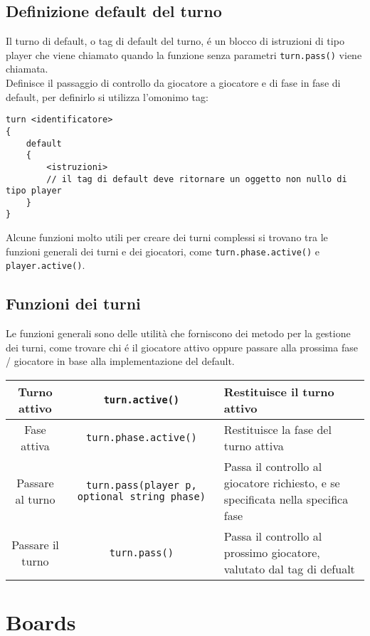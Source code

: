 \subsection{Definizione default del turno}
Il turno di default, o tag di default del turno, é un blocco di istruzioni di tipo player
che viene chiamato quando la funzione senza parametri \lstinline|turn.pass()| viene chiamata. \\
Definisce il passaggio di controllo da giocatore a giocatore e di fase in fase di default,
per definirlo si utilizza l'omonimo tag:
\begin{lstlisting}
turn <identificatore>
{
    default
    {
        <istruzioni>
        // il tag di default deve ritornare un oggetto non nullo di tipo player
    }
}
\end{lstlisting}
Alcune funzioni molto utili per creare dei turni complessi si trovano tra le 
funzioni generali dei turni e dei giocatori, come \lstinline|turn.phase.active()| e
\lstinline|player.active()|.

\subsection{Funzioni dei turni}
Le funzioni generali sono delle utilità che forniscono dei metodo per la gestione
dei turni, come trovare chi é il giocatore attivo oppure passare alla prossima 
fase / giocatore in base alla implementazione del default. \\

\begin{tabular}{|c|c|p{5cm}|}
   \hline 
   Turno attivo & \lstinline|turn.active()| & Restituisce il turno attivo \\
   \hline
   Fase attiva & \lstinline|turn.phase.active()| & Restituisce la fase del turno attiva \\
   \hline
   Passare al turno & \lstinline|turn.pass(player p, optional string phase)| & 
   Passa il controllo al giocatore richiesto, 
   e se specificata nella specifica fase \\
   \hline
   Passare il turno & \lstinline|turn.pass()| & Passa il controllo al prossimo giocatore, valutato dal tag di defualt \\
   \hline 
\end{tabular}

\section{Boards}

